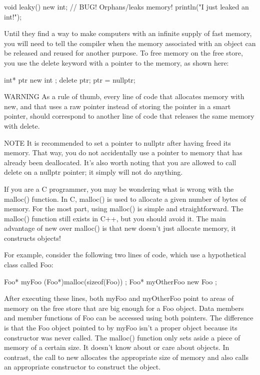 \begin{cpp}
void leaky()
{
    new int; // BUG! Orphans/leaks memory!
    println("I just leaked an int!");
}
\end{cpp}

Until they find a way to make computers with an infinite supply of fast memory, you will need to tell the compiler when the memory associated with an object can be released and reused for another purpose. To free memory on the free store, you use the delete keyword with a pointer to the memory, as shown here:

\begin{cpp}
int* ptr { new int };
delete ptr;
ptr = nullptr;
\end{cpp}

\begin{myWarning}{WARNING}
As a rule of thumb, every line of code that allocates memory with new, and that uses a raw pointer instead of storing the pointer in a smart pointer, should correspond to another line of code that releases the same memory with delete.
\end{myWarning}

\begin{myNotic}{NOTE}
It is recommended to set a pointer to nullptr after having freed its memory. That way, you do not accidentally use a pointer to memory that has already been deallocated. It’s also worth noting that you are allowed to call delete on a nullptr pointer; it simply will not do anything.
\end{myNotic}


If you are a C programmer, you may be wondering what is wrong with the malloc() function. In C, malloc() is used to allocate a given number of bytes of memory. For the most part, using malloc() is simple and straightforward. The malloc() function still exists in C++, but you should avoid it. The main advantage of new over malloc() is that new doesn’t just allocate memory, it constructs objects!

For example, consider the following two lines of code, which use a hypothetical class called Foo:

\begin{cpp}
Foo* myFoo { (Foo*)malloc(sizeof(Foo)) };
Foo* myOtherFoo { new Foo{} };
\end{cpp}

After executing these lines, both myFoo and myOtherFoo point to areas of memory on the free store that are big enough for a Foo object. Data members and member functions of Foo can be accessed using both pointers. The difference is that the Foo object pointed to by myFoo isn’t a proper object because its constructor was never called. The malloc() function only sets aside a piece of memory of a certain size. It doesn’t know about or care about objects. In contrast, the call to new allocates the appropriate size of memory and also calls an appropriate constructor to construct the object.

